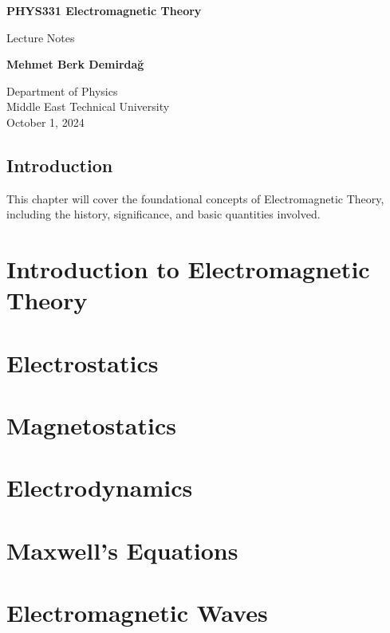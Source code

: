 \documentclass{report}
\begin{document}
	
	\begin{titlepage}
		\centering
		\vspace*{1cm}
		
		\Huge
		\textbf{PHYS331 Electromagnetic Theory}
		
		\vspace{0.5cm}
		\LARGE
		Lecture Notes
		
		\vspace{1.5cm}
		
		\textbf{Mehmet Berk Demirdağ}
		
		\vfill
		
		\Large
		Department of Physics\\
		Middle East Technical University\\
		October 1, 2024
		
	\end{titlepage}
	
	\tableofcontents
	\newpage
	
	\section*{Introduction}
	This chapter will cover the foundational concepts of Electromagnetic Theory, including the history, significance, and basic quantities involved.\\
	
	\lipsum[1-2]
	
	\chapter{Introduction to Electromagnetic Theory}
	\label{chap:intro}
	\newpage
	
	\chapter{Electrostatics}
	\label{chap:electrostatics}
	\newpage
	
	\chapter{Magnetostatics}
	\label{chap:magnetostatics}
	\newpage
	
	\chapter{Electrodynamics}
	\label{chap:electrodynamics}
	\newpage
	
	\chapter{Maxwell's Equations}
	\label{chap:maxwell}
	\newpage
	
	\chapter{Electromagnetic Waves}
	\label{chap:emwaves}
	\newpage
	

	
\end{document}
